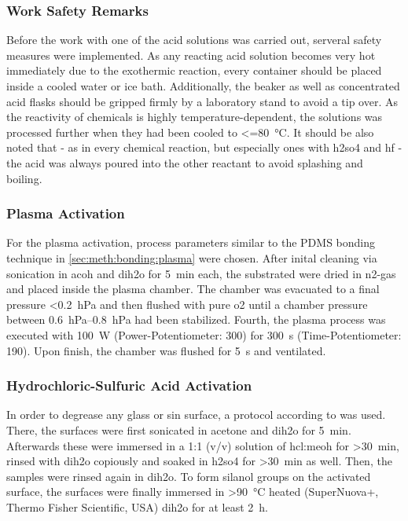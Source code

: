 \subsubsection{Work Safety Remarks}
Before the work with one of the acid solutions was carried out, serveral safety measures were implemented. As any reacting acid solution becomes very hot immediately due to the exothermic reaction, every container should be placed inside a cooled water or ice bath. Additionally, the beaker as well as concentrated acid flasks should be gripped firmly by a laboratory stand to avoid a tip over. As the reactivity of chemicals is highly temperature-dependent, the solutions was processed further when they had been cooled to \SI{<=80}{\degreeCelsius}. It should be also noted that - as in every chemical reaction, but especially ones with \gls{h2so4} and \gls{hf} - the acid was always poured into the other reactant to avoid splashing and boiling.
\subsubsection{Plasma Activation}
For the plasma activation, process parameters similar to the PDMS bonding technique in \ref{sec:meth:bonding:plasma} were chosen. After inital cleaning via sonication in \gls{acoh} and \gls{dih2o} for \SI{5}{\minute} each, the substrated were dried in \gls{n2}-gas and placed inside the plasma chamber. The chamber was evacuated to a final pressure <\SI{0.2}{\hecto\pascal} and then flushed with pure \gls{o2} until a chamber pressure between \SIrange{0.6}{0.8}{\hecto\pascal} had been stabilized. Fourth, the plasma process was executed with \SI{100}{\watt} (Power-Potentiometer: \num{300}) for \SI{300}{\second} (Time-Potentiometer: \num{190}). Upon finish, the chamber was flushed for \SI{5}{\second} and ventilated.
\subsubsection{Hydrochloric-Sulfuric Acid Activation}
In order to degrease any glass or \gls{sin} surface, a protocol according to \citet{lit:chem:Dressick} was used. There, the surfaces were first sonicated in acetone and \gls{dih2o}  for \SI{5}{\minute}. Afterwards these were immersed in a 1:1 (v/v) solution of \gls{hcl}:\gls{meoh} for \SI{>30}{\minute}, rinsed with \gls{dih2o} copiously and soaked in \gls{h2so4} for \SI{>30}{\minute} as well. Then, the samples were rinsed again in \acrlong{dih2o}. To form silanol groups on the activated surface, the surfaces were finally immersed in \SI{>90}{\degreeCelsius} heated (SuperNuova+, Thermo Fisher Scientific, USA) \gls{dih2o}  for at least \SI{2}{\hour}.
